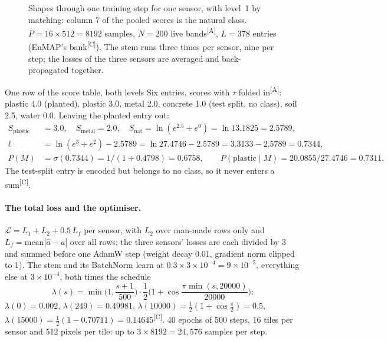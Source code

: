 \documentclass[11pt,a4paper,oneside,openany]{book}
\newcommand{\comp}{\textsuperscript{\textsf{\scriptsize[C]}}}
\newcommand{\assm}{\textsuperscript{\textsf{\scriptsize[A]}}}
\newcommand{\ahat}{\hat a}
\begin{document}
\begin{figure}[htbp]
\caption{Shapes through one training step for one sensor, with level~1 by matching: column 7 of the pooled scores is the natural class. $P=16\times512=8192$ samples,
$N=200$ live bands\assm, $L=378$ entries (EnMAP's bank\comp). The stem runs three times per sensor, nine per step; the losses of the three sensors are averaged and
back-propagated together.}
\label{fig:asbuilt:shapes}
\end{figure}

\begin{worked}[label=we:asbuilt:row]{One row of the score table, both levels}
Six entries, scores with $\tau$ folded in\assm: plastic 4.0 (planted), plastic 3.0, metal 2.0, concrete 1.0 (test split, no class), soil 2.5, water 0.0. Leaving the planted
entry out:
\begin{align*}
S_{\text{plastic}} &= 3.0,\quad S_{\text{metal}}=2.0,\quad S_{\text{nat}}=\ln(e^{2.5}+e^{0})=\ln13.1825=2.5789,\\
\ell &= \ln(e^{3}+e^{2})-2.5789 = \ln27.4746-2.5789 = 3.3133-2.5789 = 0.7344,\\
P(M) &= \sigma(0.7344)=1/(1+0.4798)=0.6758,\qquad P(\text{plastic}\mid M)=20.0855/27.4746=0.7311 .
\end{align*}
The test-split entry is encoded but belongs to no class, so it never enters a sum\comp.
\end{worked}

\paragraph{The total loss and the optimiser.} $\mathcal L=L_1+L_2+0.5\,L_f$ per sensor, with $L_2$ over man-made rows only and $L_f=\mathrm{mean}|\ahat-a|$ over all rows;
the three sensors' losses are each divided by 3 and summed before one AdamW step (weight decay 0.01, gradient norm clipped to 1). The stem and its BatchNorm learn at
$0.3\times3\times10^{-4}=9\times10^{-5}$, everything else at $3\times10^{-4}$, both times the schedule
\[
\lambda(s)=\min\Big(1,\frac{s+1}{500}\Big)\cdot\frac12\Big(1+\cos\frac{\pi\min(s,20000)}{20000}\Big):
\]
$\lambda(0)=0.002$, $\lambda(249)=0.49981$, $\lambda(10000)=\tfrac12(1+\cos\tfrac\pi2)=0.5$, $\lambda(15000)=\tfrac12(1-0.70711)=0.14645$\comp. 40 epochs of 500 steps,
16 tiles per sensor and 512 pixels per tile: up to $3\times8192=24{,}576$ samples per step.
\end{document}
